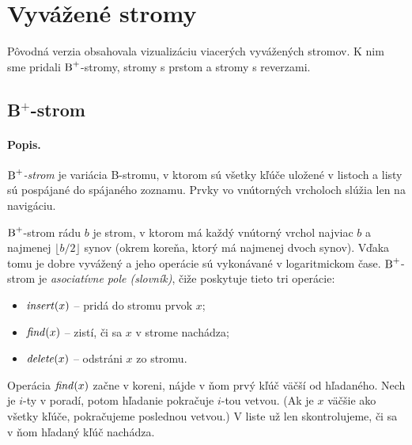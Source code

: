 \def\Bp{$\hbox{\rm B}^+$}

\section{Vyvážené stromy}

Pôvodná verzia \citep{kuko} obsahovala vizualizáciu viacerých vyvážených stromov.
K nim sme pridali \Bp-stromy, stromy s prstom a stromy s reverzami.

\subsection{B$^+$-strom}

\paragraph{Popis.}
\emph{\Bp-strom} je variácia B-stromu, v ktorom sú všetky kľúče uložené v listoch
a listy sú pospájané do spájaného zoznamu. Prvky vo vnútorných vrcholoch slúžia len
na navigáciu. 

\Bp-strom rádu $b$ je strom, v ktorom má každý vnútorný vrchol najviac $b$
a najmenej $\lfloor b/2 \rfloor$ synov (okrem koreňa, ktorý má najmenej dvoch synov).
Vďaka tomu je dobre vyvážený a jeho operácie sú vykonávané v logaritmickom čase.
\Bp-strom je \emph{asociatívne pole (slovník)}, čiže poskytuje tieto tri operácie:
\begin{itemize}
\item $\mathop{\mathit{insert}}(x)$ -- pridá do stromu prvok $x$;
\item $\mathop{\mathit{find}}(x)$ -- zistí, či sa $x$ v strome nachádza;
\item $\mathop{\mathit{delete}}(x)$ -- odstráni $x$ zo stromu.
\end{itemize}

Operácia $\mathop{\mathit{find}}(x)$ začne v koreni, nájde v ňom prvý kľúč väčší od hľadaného.
Nech je $i$-ty v poradí, potom hľadanie pokračuje $i$-tou vetvou.
(Ak je $x$ väčšie ako všetky kľúče, pokračujeme poslednou vetvou.)
V liste už len skontrolujeme, či sa v ňom hľadaný kľúč nachádza.


